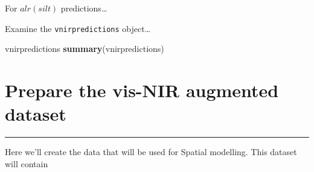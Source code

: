 \documentclass[]{book}
\newenvironment{Shaded}{\begin{snugshade}}{\end{snugshade}}
\newcommand{\CommentTok}[1]{\textcolor[rgb]{0.56,0.35,0.01}{\textit{#1}}}
\newcommand{\DataTypeTok}[1]{\textcolor[rgb]{0.13,0.29,0.53}{#1}}
\newcommand{\DecValTok}[1]{\textcolor[rgb]{0.00,0.00,0.81}{#1}}
\newcommand{\KeywordTok}[1]{\textcolor[rgb]{0.13,0.29,0.53}{\textbf{#1}}}
\newcommand{\NormalTok}[1]{#1}
\newcommand{\OperatorTok}[1]{\textcolor[rgb]{0.81,0.36,0.00}{\textbf{#1}}}
\newcommand{\StringTok}[1]{\textcolor[rgb]{0.31,0.60,0.02}{#1}}
\begin{document}
For \(alr(silt)\) predictions\ldots{}

\begin{Shaded}
\end{Shaded}

Examine the \texttt{vnirpredictions} object\ldots{}

\begin{Shaded}
\begin{Highlighting}[]
\NormalTok{vnirpredictions}
\KeywordTok{summary}\NormalTok{(vnirpredictions)}
\end{Highlighting}
\end{Shaded}

\hypertarget{prepare-the-vis-nir-augmented-dataset}{%
\chapter{Prepare the vis-NIR augmented dataset}\label{prepare-the-vis-nir-augmented-dataset}}

\begin{center}\rule{0.5\linewidth}{\linethickness}\end{center}

Here we'll create the data that will be used for Spatial modelling. This dataset will contain
\end{document}
